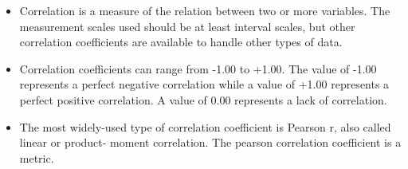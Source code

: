 		


		
		
		\begin{itemize}
			\item Correlation is a measure of the relation between two or more variables. The measurement scales used should be at least interval scales, but other correlation coefficients are available to handle other types of data.
			\item Correlation coefficients can range from -1.00 to +1.00. The value of -1.00 represents a perfect negative correlation while a value of +1.00 represents a perfect positive correlation. A value of 0.00 represents a lack of correlation.
			\item 
			The most widely-used type of correlation coefficient is Pearson r, also called linear or product- moment correlation.
			The pearson correlation coefficient is a metric.
		\end{itemize}

		
